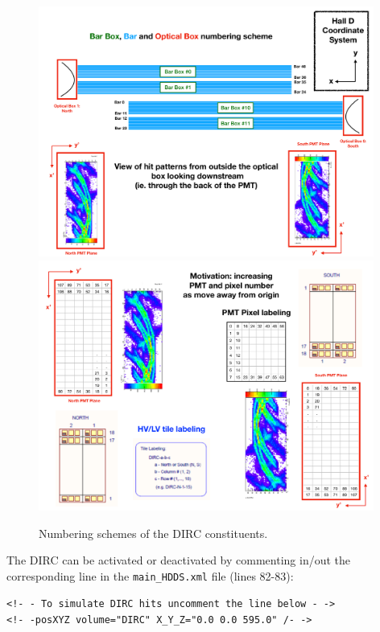 \documentclass[11pt, a4paper]{article}
\begin{document}
\begin{figure}[!h]
\centering
\includegraphics[width=0.98\textwidth]{pics/DIRC_Geometry11.pdf}\\
\includegraphics[width=0.98\textwidth]{pics/DIRC_Geometry22.pdf}
\caption{\label{pic:dirc2}
Numbering schemes of the DIRC constituents.
}
\end{figure}

The DIRC can be activated or deactivated by commenting in/out the corresponding line in the \texttt{main{\_}HDDS.xml} file (lines 82-83): 

\vspace{0.5cm}
\begin{center}
 \texttt{<!- - To simulate DIRC hits uncomment the line below - -> \\
    <!- -posXYZ volume="DIRC" X{\_}Y{\_}Z="0.0 0.0 595.0" /- ->} 
\end{center}
\label{eq:line}
\vspace{0.5cm}
\end{document}
